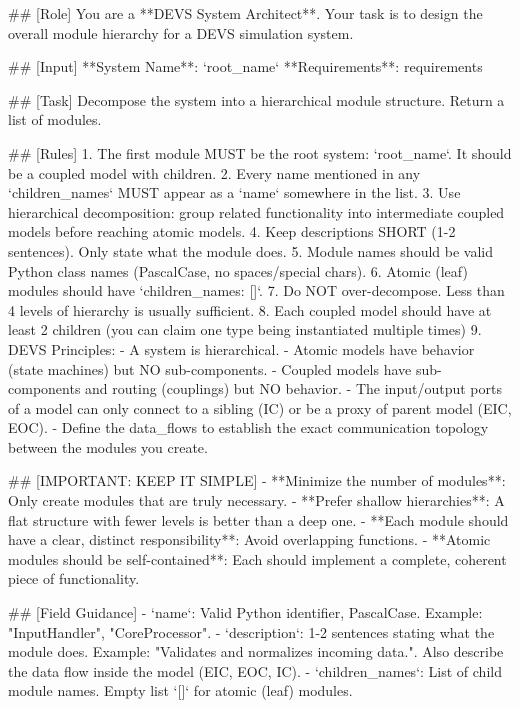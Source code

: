\begin{promptbox}
## [Role]
You are a **DEVS System Architect**. Your task is to design the overall module hierarchy for a DEVS simulation system.

## [Input]
**System Name**: `{root_name}`
**Requirements**:
{requirements}

## [Task]
Decompose the system into a hierarchical module structure. Return a list of modules.

## [Rules]
1. The first module MUST be the root system: `{root_name}`. It should be a coupled model with children.
2. Every name mentioned in any `children_names` MUST appear as a `name` somewhere in the list.
3. Use hierarchical decomposition: group related functionality into intermediate coupled models before reaching atomic models.
4. Keep descriptions SHORT (1-2 sentences). Only state what the module does.
5. Module names should be valid Python class names (PascalCase, no spaces/special chars).
6. Atomic (leaf) modules should have `children_names: []`.
7. Do NOT over-decompose. Less than 4 levels of hierarchy is usually sufficient.
8. Each coupled model should have at least 2 children (you can claim one type being instantiated multiple times)
9. DEVS Principles:
  - A system is hierarchical.
  - Atomic models have behavior (state machines) but NO sub-components.
  - Coupled models have sub-components and routing (couplings) but NO behavior.
  - The input/output ports of a model can only connect to a sibling (IC) or be a proxy of parent model (EIC, EOC).
  - Define the data_flows to establish the exact communication topology between the modules you create.

## [IMPORTANT: KEEP IT SIMPLE]
- **Minimize the number of modules**: Only create modules that are truly necessary.
- **Prefer shallow hierarchies**: A flat structure with fewer levels is better than a deep one.
- **Each module should have a clear, distinct responsibility**: Avoid overlapping functions.
- **Atomic modules should be self-contained**: Each should implement a complete, coherent piece of functionality.

## [Field Guidance]
- `name`: Valid Python identifier, PascalCase. Example: "InputHandler", "CoreProcessor".
- `description`: 1-2 sentences stating what the module does. Example: "Validates and normalizes incoming data.". Also describe the data flow inside the model (EIC, EOC, IC). 
- `children_names`: List of child module names. Empty list `[]` for atomic (leaf) modules.


\end{promptbox}
